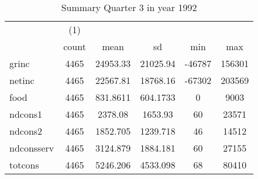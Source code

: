 \begin{table}[htbp]\centering
\def\sym#1{\ifmmode^{#1}\else\(^{#1}\)\fi}
\caption{Summary Quarter 3 in year 1992 \label{sum\_Q3\_y1992}}
\begin{tabular}{l*{1}{ccccc}}
\hline\hline
            &\multicolumn{1}{c}{(1)}&            &            &            &            \\
            &       count&        mean&          sd&         min&         max\\
\hline
grinc       &        4465&    24953.33&    21025.94&      -46787&      156301\\
netinc      &        4465&    22567.81&    18768.16&      -67302&      203569\\
food        &        4465&    831.8611&    604.1733&           0&        9003\\
ndcons1     &        4465&     2378.08&     1653.93&          60&       23571\\
ndcons2     &        4465&    1852.705&    1239.718&          46&       14512\\
ndconsserv  &        4465&    3124.879&    1884.181&          60&       27155\\
totcons     &        4465&    5246.206&    4533.098&          68&       80410\\
\hline\hline
\end{tabular}
\end{table}
